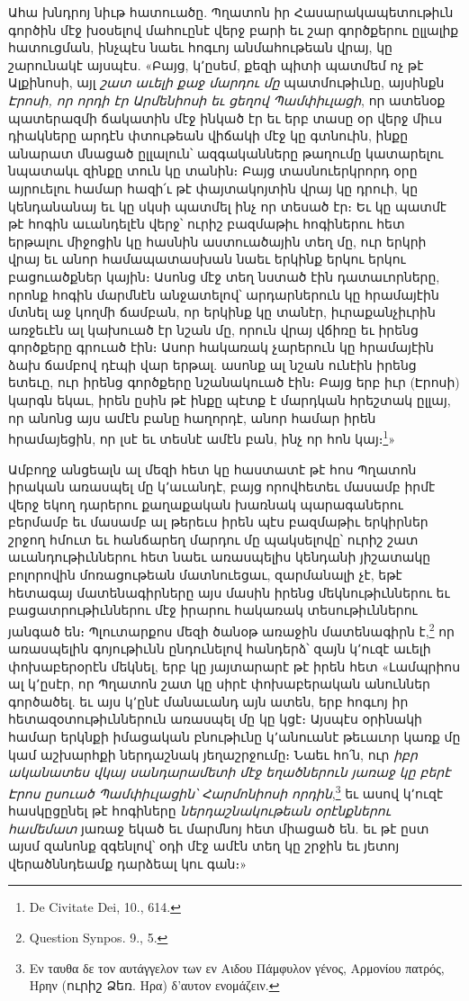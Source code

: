 \documentclass{article}
\begin{document}
{Ահա խնդրոյ նիւթ հատուածը. Պղատոն իր Հասարակապետութիւն գործին մէջ խօսելով մահուընէ վերջ բարի եւ շար գործքերու ըլլալիք հատուցման, ինչպէս նաեւ հոգւոյ անմահութեան վրայ, կը շարունակէ այսպէս. «Բայց, կ՚ըսեմ, քեզի պիտի պատմեմ ոչ թէ Ալքինոսի, այլ \emph{շատ աւելի քաջ մարդու մը} պատմութիւնը, այսինքն \emph{Էրոսի, որ որդի էր Արմենիոսի եւ ցեղով Պամփիւլացի}, որ ատենօք պատերազմի ճակատին մէջ ինկած էր եւ երբ տասը օր վերջ միւս դիակները արդէն փտութեան վիճակի մէջ կը գտնուին, ինքը անարատ մնացած ըլլալուն՝ ազգականները թաղումը կատարելու նպատակւ զինքը տուն կը տանին։ Բայց տասնուերկրորդ օրը այրուելու համար հազի՛ւ թէ փայտակոյտին վրայ կը դրուի, կը կենդանանայ եւ կը սկսի պատմել ինչ որ տեսած էր։ Եւ կը պատմէ թէ հոգին աւանդելէն վերջ՝ ուրիշ բազմաթիւ հոգիներու հետ երթալու միջոցին կը հասնին աստուածային տեղ մը, ուր երկրի վրայ եւ անոր համապատասխան նաեւ երկինք երկու երկու բացուածքներ կային։ Ասոնց մէջ տեղ նստած էին դատաւորները, որոնք հոգին մարմնէն անջատելով՝ արդարներուն կը հրամայէին մտնել աջ կողմի ճամբան, որ երկինք կը տանէր, իւրաքանչիւրին առջեւէն ալ կախուած էր նշան մը, որուն վրայ վճիռը եւ իրենց գործքերը գրուած էին։ Ասոր հակառակ չարերուն կը հրամայէին ձախ ճամբով դէպի վար երթալ. ասոնք ալ նշան ունէին իրենց ետեւը, ուր իրենց գործքերը նշանակուած էին։ Բայց երբ իւր (Էրոսի) կարգն եկաւ, իրեն ըսին թէ ինքը պէտք է մարդկան հրեշտակ ըլլայ, որ անոնց այս ամէն բանը հաղորդէ, անոր համար իրեն հրամայեցին, որ լսէ եւ տեսնէ ամէն բան, ինչ որ հոն կայ։\footnote{De Civitate Dei, 10., 614.}»

Ամբողջ անցեալն ալ մեզի հետ կը հաստատէ թէ հոս Պղատոն իրական առասպել մը կ՚աւանդէ, բայց որովհետեւ մասամբ իրմէ վերջ եկող դարերու քաղաքական խառնակ պարագաներու բերմամբ եւ մասամբ ալ թերեւս իրեն պէս բազմաթիւ երկիրներ շրջող հմուտ եւ հանճարեղ մարդու մը պակսելովը՝ ուրիշ շատ աւանդութիւններու հետ նաեւ առասպելիս կենդանի յիշատակը բոլորովին մոռացութեան մատնուեցաւ, զարմանալի չէ, եթէ հետագայ մատենագիրները այս մասին իրենց մեկնութիւններու եւ բացատրութիւններու մէջ իրարու հակառակ տեսութիւններու յանգած են։ Պլուտարքոս մեզի ծանօթ առաջին մատենագիրն է,\footnote{Question Synpos. 9., 5.} որ առասպելին գոյութիւնն ընդունելով հանդերձ՝ զայն կ՚ուզէ աւելի փոխաբերօրէն մեկնել, երբ կը յայտարարէ թէ իրեն հետ «Լամպրիոս ալ կ՚ըսէր, որ Պղատոն շատ կը սիրէ փոխաբերական անուններ գործածել. եւ այս կ՚ընէ մանաւանդ այն ատեն, երբ հոգւոյ իր հետազօտութիւններուն առասպել մը կը կցէ։ Այսպէս օրինակի համար երկնքի իմացական բնութիւնը կ՚անուանէ թեւաւոր կառք մը կամ աշխարհքի ներդաշնակ յեղաշրջումը։ Նաեւ հո՛ն, ուր \emph{իբր ականատես վկայ սանդարամետի մէջ եղածներուն յառաջ կը բերէ Էրոս ըսուած Պամփիւլացին՝ Հարմոնիոսի որդին},\footnote{Εν ταυθα δε τον αυτάγγελον των εν Αιδου Πάμφυλον γένος, Αρμονίου πατρός, Ηρην (ուրիշ Ձեռ. Ηρα) δ’αυτον ενομάζειν.} եւ ասով կ՚ուզէ հասկըցընել թէ հոգիները \emph{ներդաշնակութեան օրէնքներու համեմատ} յառաջ եկած եւ մարմնոյ հետ միացած են. եւ թէ ըստ այսմ զանոնք զգենլով՝ օդի մէջ ամէն տեղ կը շրջին եւ յետոյ վերածննդեամք դարձեալ կու գան։»

}
\end{document}
